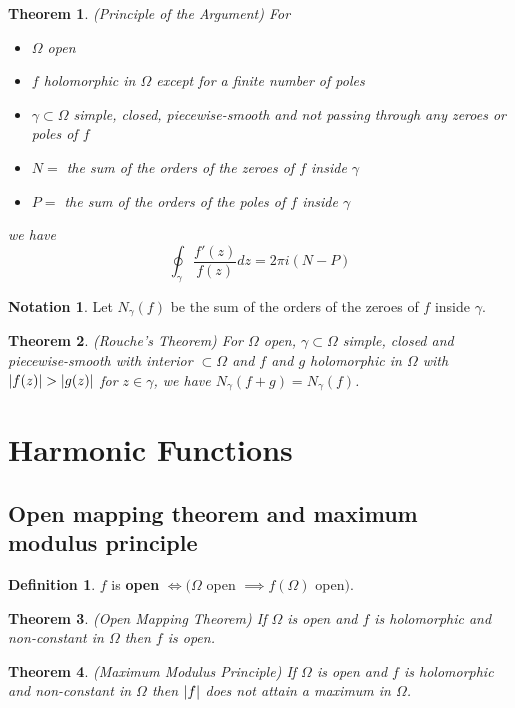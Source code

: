 \documentclass[12pt]{article}
\newtheorem{thm}{Theorem}[section]
\theoremstyle{definition}
\newtheorem{defn}{Definition}[section]
\newtheorem*{not*}{Notation}
\DeclarePairedDelimiter\abs{\lvert}{\rvert}
\begin{document}
\begin{thm}
  (Principle of the Argument)
  For 
  \begin{itemize}
    \item $\Omega$ open
    \item $f$ holomorphic in $\Omega$ except for a finite number of poles
    \item $\gamma \subset \Omega$ simple, closed, piecewise-smooth and not passing through any zeroes or poles of $f$
    \item $N =$ the sum of the orders of the zeroes of $f$ inside $\gamma$
    \item $P =$ the sum of the orders of the poles of $f$ inside $\gamma$
  \end{itemize}
  we have
  $$\oint_{\gamma}\frac{f'(z)}{f(z)}dz = 2\pi i(N - P)$$
\end{thm}

\begin{not*}
  Let $N_{\gamma}(f)$ be the sum of the orders of the zeroes of $f$ inside $\gamma$.
\end{not*}

\begin{thm}
  (Rouche's Theorem)
  For $\Omega$ open, $\gamma \subset \Omega$ simple, closed and piecewise-smooth with interior $\subset \Omega$ and $f$ and $g$ holomorphic in $\Omega$ with $\abs{f(z)} > \abs{g(z)}$ for $z \in \gamma$, we have $N_{\gamma}(f + g) = N_{\gamma}(f)$.
\end{thm}

\section{Harmonic Functions}

\subsection{Open mapping theorem and maximum modulus principle}

\begin{defn}
  $f$ is \textbf{open} $\iff (\Omega$ open $\implies f(\Omega)$ open$)$.
\end{defn}

\begin{thm}
  (Open Mapping Theorem)
  If $\Omega$ is open and $f$ is holomorphic and non-constant in $\Omega$ then $f$ is open.
\end{thm}

\begin{thm}
  (Maximum Modulus Principle)
  If $\Omega$ is open and $f$ is holomorphic and non-constant in $\Omega$ then $\abs{f}$ does not attain a maximum in $\Omega$.
\end{thm}
\end{document}
